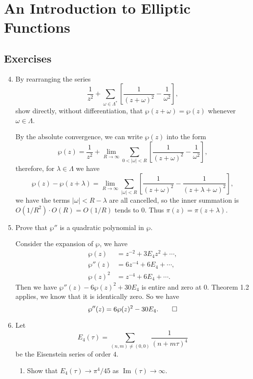 \documentclass[11pt]{report}
\theoremstyle{mythm}
\let\oldendproof\endproof
\renewenvironment{proof}[1][\proofname]{%
  \oldproof[\normalfont \bfseries #1]%
}{\oldendproof}
\renewcommand*{\proofname}{Proof}
\theoremstyle{myans}
\renewcommand{\Im}{\operatorname{Im}}
\begin{document}
\setcounter{chapter}{8}
\chapter{An Introduction to Elliptic Functions}

\section{Exercises}

\begin{enumerate}
  \setcounter{enumi}{3}
  \item By rearranging the series
  \[ \frac 1{z^2} + \sum_{\omega \in \Lambda^*} \left[\frac1{(z+\omega)^2} - \frac1{\omega^2}\right], \]
  show directly, without differentiation, that $\wp(z + \omega) = \wp(z)$ whenever $\omega \in \Lambda$.
  \begin{proof}
    By the absolute convergence, we can write $\wp(z)$ into the form
    \[ \wp(z) = \frac 1{z^2} + \lim_{R\to\infty} \sum_{0<|\omega|<R} \left[\frac1{(z+\omega)^2} - \frac1{\omega^2}\right], \]
    therefore, for $\lambda \in \Lambda$ we have
    \[ \wp(z) - \wp(z + \lambda) = \lim_{R\to\infty} \sum_{|\omega|<R} \left[\frac1{(z+\omega)^2} - \frac1{(z+\lambda+\omega)^2}\right], \]
    we have the terms $|\omega| < R-\lambda$ are all cancelled, so the inner summation is $O(1/R^2)\cdot O(R) = O(1/R)$
    tends to $0$. Thus $\pi(z)= \pi(z+\lambda)$.
  \end{proof}
  \setcounter{enumi}{5}
  \item Prove that $\wp''$ is a quadratic polynomial in $\wp$.
  \begin{proof}
    Consider the expansion of $\wp$, we have
    \begin{align*}
      \wp(z) &= z^{-2} + 3E_4 z^2 + \cdots,\\
      \wp''(z) &= 6z^{-4} + 6 E_4 + \cdots,\\
      \wp(z)^2 &= z^{-4} + 6E_4 + \cdots.
    \end{align*}
    Then we have $\wp''(z) - 6\wp(z)^2 + 30E_4$ is entire and zero at $0$. Theorem 1.2 applies, we know that
    it is identically zero. So we have
    \[ \wp''(z) = 6\wp(z)^2 - 30E_4. \qedhere \]
  \end{proof}
  \setcounter{enumi}{7}
  \item Let
  \[ E_4(\tau) = \sum_{(n,m)\neq (0,0)} \frac 1{(n+m\tau)^4} \]
  be the Eisenstein series of order $4$.
  \begin{enumerate}
    \item Show that $E_4(\tau) \to \pi^4/45$ as $\Im(\tau) \to \infty$.

\end{enumerate}
\end{enumerate}
\end{document}

